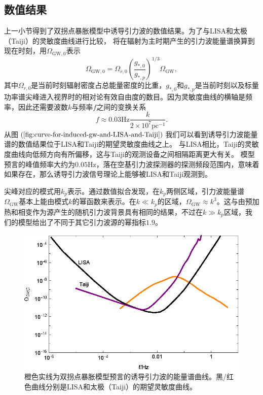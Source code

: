 \subsection{数值结果}
上一小节得到了双拐点暴胀模型中诱导引力波的数值结果。为了与LISA\citep{amaro2017laser}和太极（Taiji）\citep{guo2018taiji}的灵敏度曲线进行比较，
将在辐射为主时期产生的引力波能量谱换算到现在时刻，用$\Omega_{\text{GW},0}$表示
\begin{equation}
  \label{eq:energy-spectrum-of-GW-at-now}
  \Omega_{\text{GW},0} =
  \Omega_{r,0}{\left(\frac{g_{*,0}}{g_{*,p}}\right)}^{1
  /3}\Omega_{\text{GW}},
\end{equation}
其中$\Omega_{r,0}$是当前时刻辐射密度占总能量密度的比重，$g_{*,0}$和$g_{*,p}$是当前时刻以及标量功率谱尖峰进入视界时的相对论有效自由度的数目。因为灵敏度曲线的横轴是频率，因此还需要波数$k$与频率$f$之间的变换关系
\begin{equation}
  \label{eq:frequency-from-wave-numbers}
  f \approx 0.03\text{Hz} \frac{k}{2\times 10^{7}\text{pc}^{-1}}.
\end{equation}
从图$(\ref{fig:curve-for-induced-gw-and-LISA-and-Taiji})$我们可以看到诱导引力波能量谱的数值结果位于LISA\citep{amaro2017laser}和Taiji\citep{guo2018taiji}的期望灵敏度曲线之上。
与LISA相比，Taiji的灵敏度曲线向低频方向有所偏移，这与Taiji的观测设备之间相隔距离更大有关。
模型预言的峰值频率大约为$0.05\text{Hz}$，落在空基引力波探测器的探测频段范围内，意味着如果存在，那么诱导引力波信号理论上能够被LISA和Taiji观测到。

尖峰对应的模式用$k_{p}$表示。通过数值拟合发现，在$k_{p}$两侧区域，引力波能量谱
$\Omega_{\text{GW}}$基本上能由模式$k$的幂函数来表示。在$k\ll
k_{p}$的区域，$\Omega_{\text{GW}}\approx
k^3$。这与由预加热和相变作为源产生的随机引力波背景具有相同的结果，不过在$k\gg
k_{p}$区域，我们的模型给出了不同于其它引力波源的幂指标$1.9$。

\begin{figure}[!htbp]
  \centering
  \includegraphics[width=6in]{Img/Lisa2.eps}
  \caption{橙色实线为双拐点暴胀模型预言的诱导引力波的能量谱曲线。黑/红色曲线分别是LISA\citep{amaro2017laser}和太极（Taiji）\citep{guo2018taiji}的期望灵敏度曲线。}\label{fig:curve-for-induced-gw-and-LISA-and-Taiji}
\end{figure}

